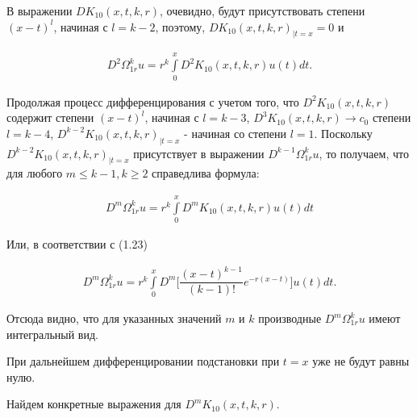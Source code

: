 В выражении $ DK_{10}(x,t,k,r) $, очевидно, будут присутствовать степени $ (x-t)^l $, начиная с $ l = k - 2 $, поэтому, $ DK_{10}(x,t,k,r)_{|t=x} = 0 $ и

\begin{equation}
\begin{array}{c}
\nonumber

D^2\Omega_{1r}^ku = r^k\int\limits_0^x D^2K_{10}(x,t,k,r)u(t)dt.

\end{array}
\end{equation}


Продолжая процесс дифференцирования с учетом того, что $ D^2K_{10}(x,t,k,r) $ содержит степени $ (x-t)^l $, начиная с $ l = k - 3 $, $ D^3K_{10}(x,t,k,r) \rightarrow c_0 $  степени $ l = k - 4 $, $ D^{k-2}K_{10}(x,t,k,r)_{|t=x} $ - начиная со степени $ l = 1 $. Поскольку $ D^{k-2}K_{10}(x,t,k,r)_{|t=x} $ присутствует в выражении $ D^{k-1}\Omega_{1r}^ku $, то получаем, что для любого $ m \leq k - 1, k \geq 2 $ справедлива формула:

\begin{equation}
\begin{array}{c}
\nonumber

D^m\Omega_{1r}^ku = r^k\int\limits_0^x D^mK_{10}(x,t,k,r)u(t)dt

\end{array}
\end{equation}

Или, в соответствии с (1.23)

\begin{equation}
\begin{array}{c}

D^m\Omega_{1r}^ku = r^k\int\limits_0^x D^m\biggl[\dfrac{(x-t)^{k-1}}{(k-1)!}e^{-r(x-t)}\biggr]u(t)dt.

\end{array}
\end{equation}

Отсюда видно, что для указанных значений $ m $ и $ k $ производные $ D^m\Omega_{1r}^ku $ имеют интегральный вид.

При дальнейшем дифференцировании подстановки при $ t = x $ уже не будут равны нулю.


Найдем конкретные выражения для $ D^mK_{10}(x,t,k,r) $.


